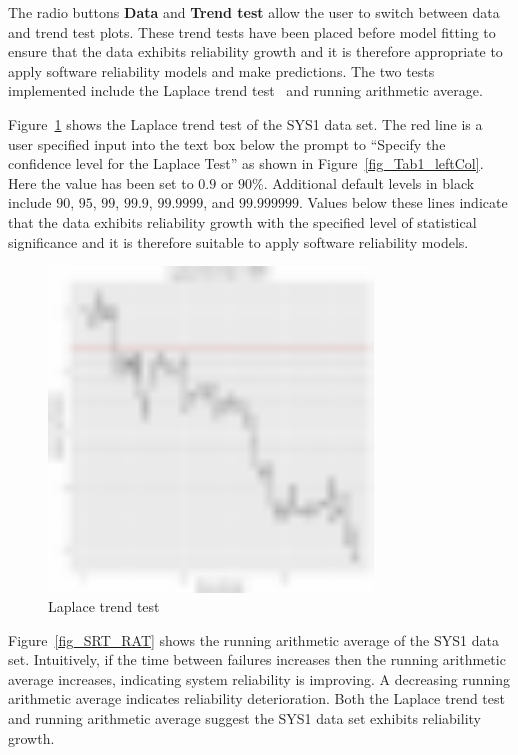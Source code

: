 \documentclass[journal]{IEEEtran}
\begin{document}
The radio buttons \textbf{Data} and \textbf{Trend test} allow the user to switch between data and trend test plots. These trend tests have been placed before model fitting to ensure that the data exhibits reliability growth and it is therefore appropriate to apply software reliability models and make predictions. The two tests implemented include the Laplace trend test~\cite{gaudoin1992optimal} and running arithmetic average.

Figure~\ref{fig_Tab1_Laplace} shows the Laplace trend test of the SYS1 data set. The red line is a user specified input into the text box below the prompt to ``Specify the confidence level for the Laplace Test'' as shown in Figure~\ref{fig_Tab1_leftCol}. Here the value has been set to $0.9$ or $90\%$. Additional default levels in black include $90$, $95$, $99$, $99.9$, $99.9999$, and $99.999999$. Values below these lines indicate that the data exhibits reliability growth with the specified level of statistical significance and it is therefore suitable to apply software reliability models.

\begin{figure}[!h]
\centering
\includegraphics[width=3.4in]{Figures/SRT3}
\caption{Laplace trend test}
\label{fig_Tab1_Laplace}
\end{figure}


Figure~\ref{fig_SRT_RAT} shows the running arithmetic average of the SYS1 data set. Intuitively, if the time between failures increases then the running arithmetic average increases, indicating system reliability is improving. A decreasing running arithmetic average indicates reliability deterioration. Both the Laplace trend test and running arithmetic average suggest the SYS1 data set exhibits reliability growth.
\end{document}
